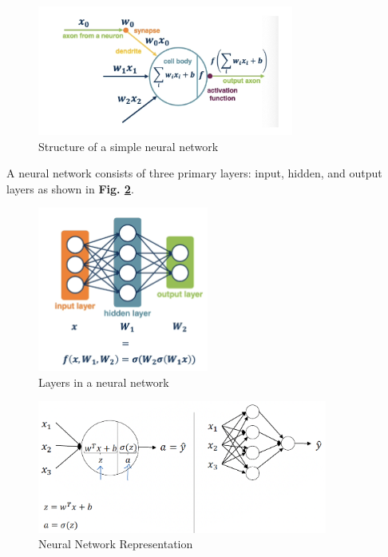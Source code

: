 \documentclass[letterpaper,12pt,notitlepage,twoside]{report}
\begin{document}
\begin{figure}[h]
	\centering
	\includegraphics[width=0.75\textwidth]{Images/Activation function.png}
	\caption{Structure of a simple neural network}
	\label{fig:12}
\end{figure}

A neural network consists of three primary layers: input, hidden, and output layers as shown in \textbf{Fig. \ref{fig:13}}.

\begin{figure}[h]
	\centering
	\includegraphics[width=0.5\textwidth]{Images/Layers in a neural network.png}
	\caption{Layers in a neural network}
	\label{fig:13}
\end{figure}

\begin{figure}[h]
	\centering
	\includegraphics[width=0.85\textwidth]{Images/Neural Network Representation.png}
	\caption{Neural Network Representation}
	\label{fig:14}
\end{figure}
\FloatBarrier
\end{document}
